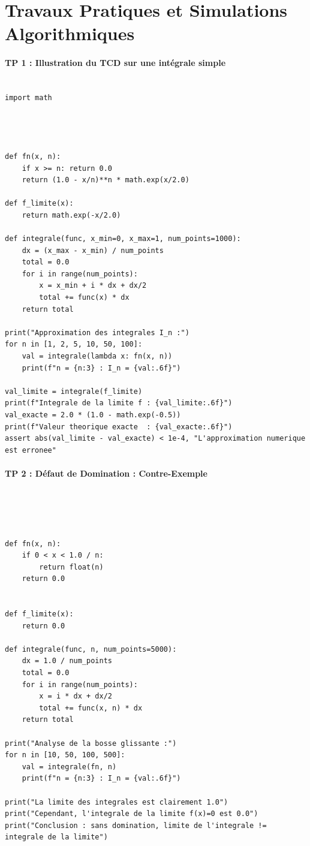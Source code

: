 \documentclass[11pt,a4paper]{article}
\begin{document}
\newpage
\part{Travaux Pratiques et Simulations Algorithmiques}
\subsection*{TP 1 : Illustration du TCD sur une intégrale simple}

\begin{lstlisting}

import math




def fn(x, n):
    if x >= n: return 0.0
    return (1.0 - x/n)**n * math.exp(x/2.0)

def f_limite(x):
    return math.exp(-x/2.0)

def integrale(func, x_min=0, x_max=1, num_points=1000):
    dx = (x_max - x_min) / num_points
    total = 0.0
    for i in range(num_points):
        x = x_min + i * dx + dx/2
        total += func(x) * dx
    return total

print("Approximation des integrales I_n :")
for n in [1, 2, 5, 10, 50, 100]:
    val = integrale(lambda x: fn(x, n))
    print(f"n = {n:3} : I_n = {val:.6f}")

val_limite = integrale(f_limite)
print(f"Integrale de la limite f : {val_limite:.6f}")
val_exacte = 2.0 * (1.0 - math.exp(-0.5))
print(f"Valeur theorique exacte  : {val_exacte:.6f}")
assert abs(val_limite - val_exacte) < 1e-4, "L'approximation numerique est erronee"
\end{lstlisting}

\subsection*{TP 2 : Défaut de Domination : Contre-Exemple}

\begin{lstlisting}




def fn(x, n):
    if 0 < x < 1.0 / n:
        return float(n)
    return 0.0


def f_limite(x):
    return 0.0

def integrale(func, n, num_points=5000):
    dx = 1.0 / num_points
    total = 0.0
    for i in range(num_points):
        x = i * dx + dx/2
        total += func(x, n) * dx
    return total

print("Analyse de la bosse glissante :")
for n in [10, 50, 100, 500]:
    val = integrale(fn, n)
    print(f"n = {n:3} : I_n = {val:.6f}")

print("La limite des integrales est clairement 1.0")
print("Cependant, l'integrale de la limite f(x)=0 est 0.0")
print("Conclusion : sans domination, limite de l'integrale != integrale de la limite")
\end{lstlisting}
\end{document}
